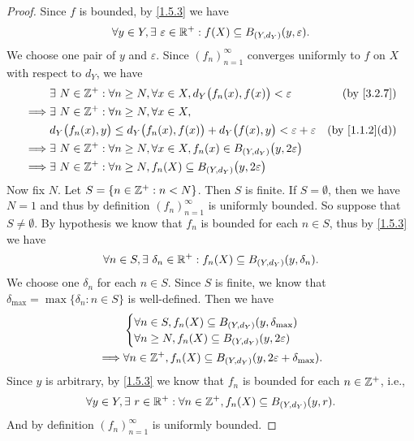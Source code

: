 \begin{proof}
  Since \(f\) is bounded, by \cref{1.5.3} we have
  \[
    \forall y \in Y, \exists\ \varepsilon \in \mathbb{R}^+ : f(X) \subseteq B_{(Y, d_Y)}(y, \varepsilon).
  \]
  We choose one pair of \(y\) and \(\varepsilon\).
  Since \((f_n)_{n = 1}^\infty\) converges uniformly to \(f\) on \(X\) with respect to \(d_Y\), we have
  \begin{align*}
             & \exists\ N \in \Z^+ : \forall n \geq N, \forall x \in X, d_Y\big(f_n(x), f(x)\big) < \varepsilon          & \text{(by \cref{3.2.7})}    \\
    \implies & \exists\ N \in \Z^+ : \forall n \geq N, \forall x \in X,                                                                                \\
             & d_Y\big(f_n(x), y\big) \leq d_Y\big(f_n(x), f(x)\big) + d_Y\big(f(x), y\big) < \varepsilon + \varepsilon  & \text{(by \cref{1.1.2}(d))} \\
    \implies & \exists\ N \in \Z^+ : \forall n \geq N, \forall x \in X, f_n(x) \in B_{(Y, d_Y)}\big(y, 2\varepsilon\big)                               \\
    \implies & \exists\ N \in \Z^+ : \forall n \geq N, f_n(X) \subseteq B_{(Y, d_Y)}\big(y, 2\varepsilon\big)
  \end{align*}
  Now fix \(N\).
  Let \(S = \{n \in \mathbb{Z}^+ : n < N\}\).
  Then \(S\) is finite.
  If \(S = \emptyset\), then we have \(N = 1\) and thus by definition \((f_n)_{n = 1}^\infty\) is uniformly bounded.
  So suppose that \(S \neq \emptyset\).
  By hypothesis we know that \(f_n\) is bounded for each \(n \in S\), thus by \cref{1.5.3} we have
  \[
    \forall n \in S, \exists\ \delta_n \in \mathbb{R}^+ : f_n(X) \subseteq B_{(Y, d_Y)}(y, \delta_n).
  \]
  We choose one \(\delta_n\) for each \(n \in S\).
  Since \(S\) is finite, we know that \(\delta_{\max} = \max\{\delta_n : n \in S\}\) is well-defined.
  Then we have
  \begin{align*}
             & \begin{cases}
                 \forall n \in S, f_n(X) \subseteq B_{(Y, d_Y)}(y, \delta_{\max}) \\
                 \forall n \geq N, f_n(X) \subseteq B_{(Y, d_Y)}(y, 2\varepsilon)
               \end{cases}                    \\
    \implies & \forall n \in \mathbb{Z}^+, f_n(X) \subseteq B_{(Y, d_Y)}(y, 2\varepsilon + \delta_{\max}).
  \end{align*}
  Since \(y\) is arbitrary, by \cref{1.5.3} we know that \(f_n\) is bounded for each \(n \in \mathbb{Z}^+\), i.e.,
  \[
    \forall y \in Y, \exists\ r \in \mathbb{R}^+ : \forall n \in \mathbb{Z}^+, f_n(X) \subseteq B_{(Y, d_Y)}(y, r).
  \]
  And by definition \((f_n)_{n = 1}^\infty\) is uniformly bounded.
\end{proof}